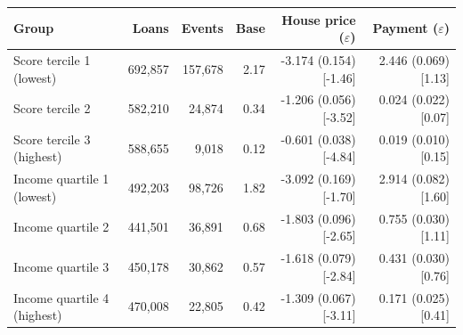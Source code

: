 \begin{tabular}{lrrrrr}
\toprule
Group & Loans & Events & Base & House price ($\varepsilon$) & Payment ($\varepsilon$) \\
\midrule
Score tercile 1 (lowest) & 692,857 & 157,678 & 2.17 & -3.174 (0.154) [-1.46] & 2.446 (0.069) [1.13] \\
Score tercile 2 & 582,210 & 24,874 & 0.34 & -1.206 (0.056) [-3.52] & 0.024 (0.022) [0.07] \\
Score tercile 3 (highest) & 588,655 & 9,018 & 0.12 & -0.601 (0.038) [-4.84] & 0.019 (0.010) [0.15] \\
Income quartile 1 (lowest) & 492,203 & 98,726 & 1.82 & -3.092 (0.169) [-1.70] & 2.914 (0.082) [1.60] \\
Income quartile 2 & 441,501 & 36,891 & 0.68 & -1.803 (0.096) [-2.65] & 0.755 (0.030) [1.11] \\
Income quartile 3 & 450,178 & 30,862 & 0.57 & -1.618 (0.079) [-2.84] & 0.431 (0.030) [0.76] \\
Income quartile 4 (highest) & 470,008 & 22,805 & 0.42 & -1.309 (0.067) [-3.11] & 0.171 (0.025) [0.41] \\
\bottomrule
\end{tabular}
